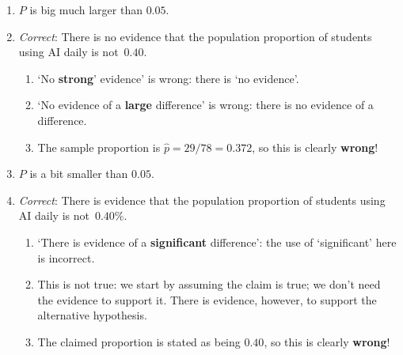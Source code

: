 \documentclass[
  11pt,
  a4paper,
  krantz2]{krantz}
\providecommand{\tightlist}{%
  \setlength{\itemsep}{0pt}\setlength{\parskip}{0pt}}
\begin{document}
\begin{footnotesize}
\begin{enumerate}
  \begin{enumerate}
  \def\labelenumii{\alph{enumii}.}
  \tightlist
  \item
    `Significant' is not appropriate in the hypothesis.
  \item
    No parameter is given; the hypothesis should include (and define!) the parameter~\(p\), the proportion of students using AI daily.
  \item
    The alternative is \emph{not equal to} \(0.40\).
  \item
    The hypothesis are \textbf{not} about the \emph{numbers}; they are about \emph{proportions}.
  \end{enumerate}
\item
  \(P\) is big much larger than \(0.05\).
\item
  \emph{Correct}: There is no evidence that the population proportion of students using AI daily is not~\(0.40\).

  \begin{enumerate}
  \def\labelenumii{\alph{enumii}.}
  \tightlist
  \item
    `No \textbf{strong}' evidence' is wrong: there is `no evidence'.
  \item
    `No evidence of a \textbf{large} difference' is wrong: there is no evidence of a difference.
  \item
    The sample proportion is \(\hat{p} = 29/78 = 0.372\), so this is clearly \textbf{wrong}!
  \end{enumerate}
\item
  \(P\) is a bit smaller than \(0.05\).
\item
  \emph{Correct}: There is evidence that the population proportion of students using AI daily is not~\(0.40\)\%.

  \begin{enumerate}
  \def\labelenumii{\alph{enumii}.}
  \tightlist
  \item
    `There is evidence of a \textbf{significant} difference': the use of `significant' here is incorrect.
  \item
    This is not true: we start by assuming the claim is true; we don't need the evidence to support it.
    There is evidence, however, to support the alternative hypothesis.
  \item
    The claimed proportion is stated as being \(0.40\), so this is clearly \textbf{wrong}!
  \end{enumerate}
\end{enumerate}


\end{footnotesize}
\end{document}
